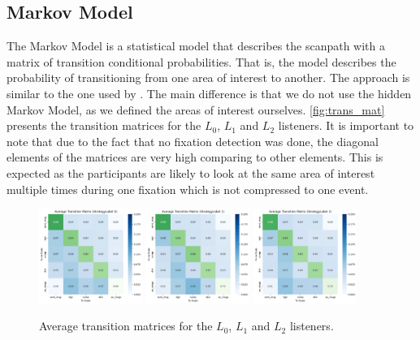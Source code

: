 \subsection{Markov Model}
\label{sec:markov_model}
The Markov Model is a statistical model that describes the scanpath with a matrix of transition conditional probabilities. That is, the model describes the probability of transitioning from one area of interest to another. The approach is similar to the one used by \cite{Coutrot_2018}. The main difference is that we do not use the hidden Markov Model, as we defined the areas of interest ourselves. \autoref{fig:trans_mat} presents the transition matrices for the $L_0$, $L_1$ and $L_2$ listeners. It is important to note that due to the fact that no fixation detection was done, the diagonal elements of the matrices are very high comparing to other elements. This is expected as the participants are likely to look at the same area of interest multiple times during one fixation which is not compressed to one event. 

\begin{figure}
    \centering
    \includegraphics[width=0.3\textwidth]{images/trans_mat_l0.png}
    \includegraphics[width=0.3\textwidth]{images/trans_mat_l1.png}
    \includegraphics[width=0.3\textwidth]{images/trans_mat_l2.png}
    \caption{Average transition matrices for the $L_0$, $L_1$ and $L_2$ listeners.}
    \label{fig:trans_mat}
\end{figure}

